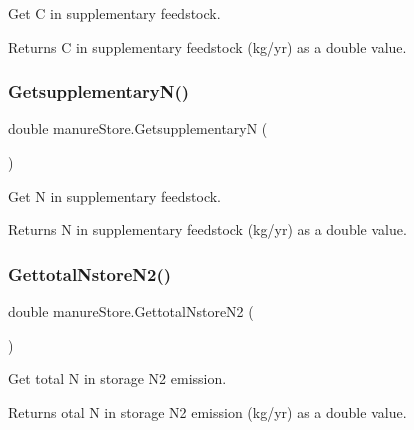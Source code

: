 Get C in supplementary feedstock. 

\begin{DoxyReturn}{Returns}
C in supplementary feedstock (kg/yr) as a double value. 
\end{DoxyReturn}
\mbox{\label{classmanure_store_affdd4f35b4bd40bd5293e95c5ff482bf}} 
\subsubsection{\texorpdfstring{GetsupplementaryN()}{GetsupplementaryN()}}
{\footnotesize\ttfamily double manure\+Store.\+GetsupplementaryN (\begin{DoxyParamCaption}{ }\end{DoxyParamCaption})\hspace{0.3cm}{\ttfamily [inline]}}



Get N in supplementary feedstock. 

\begin{DoxyReturn}{Returns}
N in supplementary feedstock (kg/yr) as a double value. 
\end{DoxyReturn}
\mbox{\label{classmanure_store_ae7bc563816e8632a495a39eaca93735f}} 
\subsubsection{\texorpdfstring{GettotalNstoreN2()}{GettotalNstoreN2()}}
{\footnotesize\ttfamily double manure\+Store.\+Gettotal\+Nstore\+N2 (\begin{DoxyParamCaption}{ }\end{DoxyParamCaption})\hspace{0.3cm}{\ttfamily [inline]}}



Get total N in storage N2 emission. 

\begin{DoxyReturn}{Returns}
otal N in storage N2 emission (kg/yr) as a double value. 
\end{DoxyReturn}
\mbox{\label{classmanure_store_a60fd8ec9acb19e7139b9ad47fd5cc351}} 
